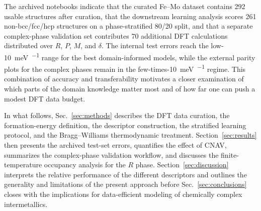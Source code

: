 The archived notebooks indicate that the curated Fe--Mo dataset contains 292 usable structures after curation, that the downstream learning analysis scores 261 non-bcc/fcc/hcp structures on a phase-stratified 80/20 split, and that a separate complex-phase validation set contributes 70 additional DFT calculations distributed over $R$, $P$, $M$, and $\delta$. The internal test errors reach the low-\SI{10}{\milli\electronvolt\per\atom} range for the best domain-informed models, while the external parity plots for the complex phases remain in the few-times-\SI{10}{\milli\electronvolt\per\atom} regime. This combination of accuracy and transferability motivates a closer examination of which parts of the domain knowledge matter most and of how far one can push a modest DFT data budget.

In what follows, Sec.~\ref{sec:methods} describes the DFT data curation, the formation-energy definition, the descriptor construction, the stratified learning protocol, and the Bragg--Williams thermodynamic treatment. Section~\ref{sec:results} then presents the archived test-set errors, quantifies the effect of CNAV, summarizes the complex-phase validation workflow, and discusses the finite-temperature occupancy analysis for the $R$ phase. Section~\ref{sec:discussion} interprets the relative performance of the different descriptors and outlines the generality and limitations of the present approach before Sec.~\ref{sec:conclusions} closes with the implications for data-efficient modeling of chemically complex intermetallics.
